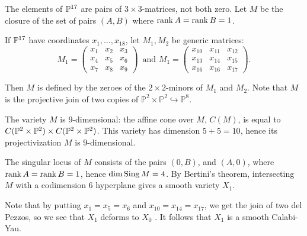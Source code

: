 The elements of $\P^{17}$ are pairs of $3 \times 3$-matrices, not both zero. Let $M$ be the closure of the set of pairs $(A,B)$ where $\rank A = \rank B = 1$. 

If $\P^{17}$ have coordinates $x_1,\ldots,x_{18}$, let $M_1, M_2$ be generic matrices:
\[
M_1 = \begin{pmatrix}
x_1 & x_2 & x_3 \\
x_4 & x_5 & x_6 \\
x_7 & x_8 & x_9 
\end{pmatrix}\,
\text{ and }
M_1 = \begin{pmatrix}
x_{10} & x_{11} & x_{12} \\
x_{13} & x_{14} & x_{15} \\
x_{16} & x_{16} & x_{17}
\end{pmatrix}.
\]

Then $M$ is defined by the zeroes of the $2 \times 2$-minors of $M_1$ and $M_2$. Note that $M$ is the projective join of two copies of $\mathbb P^2 \times \mathbb P^2 \hookrightarrow \mathbb P^8$. 

The variety $M$ is $9$-dimensional: the affine cone over $M$, $C(M)$, is equal to $C(\mathbb P^2 \times \P^2) \times C(\mathbb P^2 \times \P^2)$. This variety has dimension $5+5=10$, hence its projectivization $M$ is $9$-dimensional. 

The singular locus of $M$ consists of the pairs $(0,B)$, and $(A,0)$, where $\rank A= \rank B = 1$, hence $\dim \sing M = 4$. By Bertini's theorem, intersecting $M$ with a codimension $6$ hyperplane gives a smooth variety $X_1$.

Note that by putting $x_1=x_5=x_6$ and $x_{10}=x_{14}=x_{17}$, we get the join of two del Pezzos, so we see that $X_1$ deforms to $X_0$ . It follows that $X_1$ is a smooth Calabi-Yau.

